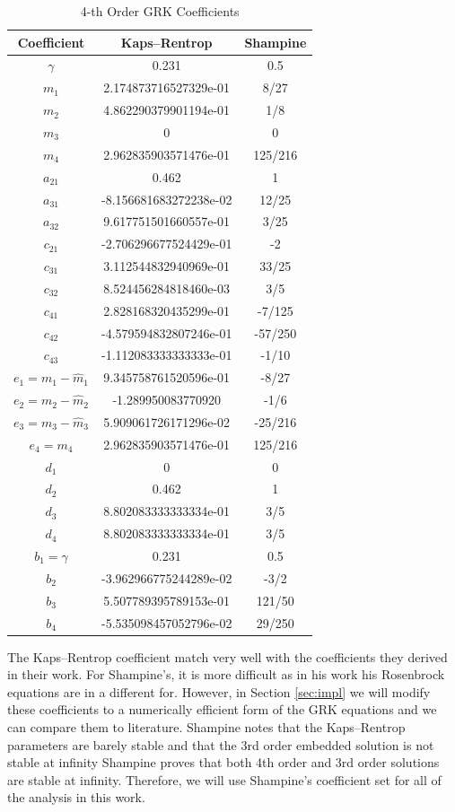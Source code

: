 \documentclass{ansconf}
\numberwithin{equation}{section}
\begin{document}
\begin{table}
\caption{4-th Order GRK Coefficients}
\label{tab:coefs}
\centering
\begin{tabular}{ccc}
\toprule
Coefficient & Kaps--Rentrop & Shampine \tabularnewline
\midrule
\midrule
$\gamma$ & 0.231 & 0.5 \tabularnewline
\midrule
$m_1$ & 2.174873716527329e-01 & 8/27 \tabularnewline
\midrule
$m_2$ & 4.862290379901194e-01 & 1/8 \tabularnewline
\midrule
$m_3$ & 0 & 0 \tabularnewline
\midrule
$m_4$ & 2.962835903571476e-01 & 125/216 \tabularnewline
\midrule
$a_{21}$ & 0.462 & 1 \tabularnewline
\midrule
$a_{31}$ & -8.156681683272238e-02 & 12/25 \tabularnewline
\midrule
$a_{32}$ &  9.617751501660557e-01 & 3/25 \tabularnewline
\midrule
$c_{21}$ & -2.706296677524429e-01 & -2 \tabularnewline
\midrule
$c_{31}$ &  3.112544832940969e-01 & 33/25 \tabularnewline
\midrule
$c_{32}$ &  8.524456284818460e-03 & 3/5 \tabularnewline
\midrule
$c_{41}$ &  2.828168320435299e-01 & -7/125 \tabularnewline
\midrule
$c_{42}$ & -4.579594832807246e-01 & -57/250 \tabularnewline
\midrule
$c_{43}$ & -1.112083333333333e-01 & -1/10 \tabularnewline
\midrule
$e_1 = m_1 - \hat{m}_1$ & 9.345758761520596e-01 & -8/27 \tabularnewline
\midrule
$e_2 = m_2 - \hat{m}_2$ & -1.289950083770920 & -1/6 \tabularnewline
\midrule
$e_3 = m_3 - \hat{m}_3$ & 5.909061726171296e-02 & -25/216 \tabularnewline
\midrule
$e_4 = m_4$ & 2.962835903571476e-01 & 125/216 \tabularnewline
\midrule
$d_1$ & 0 & 0 \tabularnewline
\midrule
$d_2$ & 0.462 & 1 \tabularnewline
\midrule
$d_3$ & 8.802083333333334e-01 & 3/5 \tabularnewline
\midrule
$d_4$ & 8.802083333333334e-01 & 3/5  \tabularnewline
\midrule
$b_1 = \gamma$ & 0.231 & 0.5 \tabularnewline
\midrule
$b_2$ & -3.962966775244289e-02 & -3/2 \tabularnewline
\midrule
$b_3$ & 5.507789395789153e-01 & 121/50 \tabularnewline
\midrule
$b_4$ & -5.535098457052796e-02 & 29/250 \tabularnewline
\bottomrule
\end{tabular}
\end{table}
The Kaps--Rentrop coefficient match very well with the coefficients they derived in their work. For Shampine's, it is more difficult as in his work his Rosenbrock equations are in a different for. However, in Section \ref{sec:impl} we will modify these coefficients to a numerically efficient form of the GRK equations and we can compare them to literature. Shampine notes that the Kaps--Rentrop parameters are barely stable and that the 3rd order embedded solution is not stable at infinity Shampine proves that both 4th order and 3rd order solutions are stable at infinity. Therefore, we will use Shampine's coefficient set for all of the analysis in this work.
\end{document}
